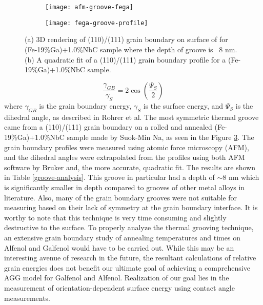 \begin{figure}[h]
	\centering
	\begin{subfigure}[c]{0.45\textwidth}
		\texttt{[image: afm-groove-fega]}
		\subcaption{~}
		\label{fig:afm-groove-fega}		
	\end{subfigure}
	\begin{subfigure}[c]{0.45\textwidth} 
		\texttt{[image: fega-groove-profile]}
		\subcaption{~}
		\label{fig:fega-groove-profile}		
	\end{subfigure}
	\caption{(a) 3D rendering of (110)/(111) grain boundary on surface of  for (Fe-19\%Ga)+1.0\%NbC sample where the depth of groove is ~8 nm. (b) A quadratic fit of a (110)/(111) grain boundary profile for a (Fe-19\%Ga)+1.0\%NbC sample.}
	\label{fig:thermal-groove}
\end{figure}
\begin{equation}
	\frac{\gamma_{GB}}{\gamma_{S}} = 2\cos\left(\frac{\Psi_{S}}{2}\right) 
\end{equation}
where $\gamma_{GB}$ is the grain boundary energy, $\gamma_{S}  $ is the surface energy, and $\Psi_{S} $ is the dihedral angle, as described in Rohrer et al.\cite{Rohrer2010a} The most symmetric thermal groove came from a \hkl(110)/\hkl(111) grain boundary on a rolled and annealed (Fe-19\%Ga)+1.0\%NbC sample made by Suok-Min Na, as seen in the Figure \ref{fig:thermal-groove}.  The grain boundary profiles were measured using atomic force microscopy (AFM), and the dihedral angles were extrapolated from the profiles using both AFM software by Bruker and, the more accurate, quadratic fit.  The results are shown in Table \ref{groove-analysis}.  This groove in particular had a depth of $\sim$8 nm which is significantly smaller in depth compared to grooves of other metal alloys in literature.  Also, many of the grain boundary grooves were not suitable for measuring based on their lack of symmetry at the grain boundary interface. It is worthy to note that this technique is very time consuming and slightly destructive to the surface. To properly analyze the thermal grooving technique, an extensive grain boundary study of annealing temperatures and times on Alfenol and Galfenol would have to be carried out. While this may be an interesting avenue of research in the future, the resultant calculations of relative grain energies does not benefit our ultimate goal of achieving a comprehensive AGG model for Galfenol and Alfenol. Realization of our goal lies in the measurement of orientation-dependent surface energy using contact angle measurements. 


